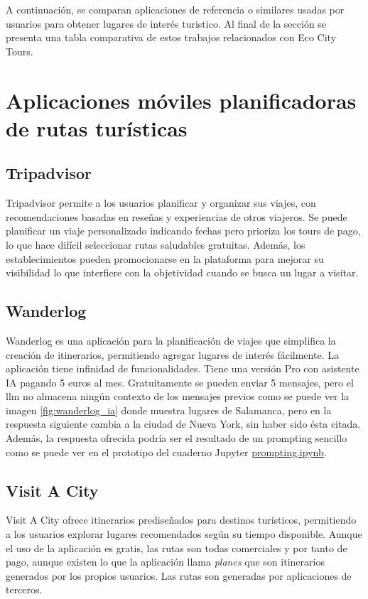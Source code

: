 
A continuación, se comparan aplicaciones de referencia o similares usadas por usuarios para obtener lugares de interés turistico. Al final de la sección se presenta una tabla comparativa de estos trabajos relacionados con Eco City Tours.
\section{Aplicaciones móviles planificadoras de rutas turísticas}
\subsection{Tripadvisor}
Tripadvisor\cite{tripadvisor} permite a los usuarios planificar y organizar sus viajes, con recomendaciones basadas en reseñas y experiencias de otros viajeros. Se puede planificar un viaje personalizado indicando fechas pero prioriza los tours de pago, lo que hace difícil seleccionar rutas saludables gratuitas. Además, los establecimientos pueden promocionarse en la plataforma para mejorar su visibilidad lo que interfiere con la objetividad cuando se busca un lugar a visitar.

\subsection{Wanderlog}
Wanderlog\cite{wanderlog} es una aplicación para la planificación de viajes que simplifica la creación de itinerarios, permitiendo agregar lugares de interés fácilmente. La aplicación tiene infinidad de funcionalidades. Tiene una versión Pro con asistente IA pagando 5 euros al mes. Gratuitamente se pueden enviar 5 mensajes, pero el \acrshort{llm} no almacena ningún contexto de los mensajes previos como se puede ver la imagen \ref{fig:wanderlog_ia} donde muestra lugares de  Salamanca, pero en la respuesta siguiente cambia a la ciudad de Nueva York, sin haber sido ésta citada. Además, la respuesta ofrecida podría ser el resultado de un prompting sencillo como se puede ver en el prototipo del cuaderno Jupyter \href{https://github.com/fps1001/TFGII_FPisot/tree/main/project-prototypes/prompting.ipynb}{prompting.ipynb}.

\subsection{Visit A City}
Visit A City\cite{visitacity} ofrece itinerarios prediseñados para destinos turísticos, permitiendo a los usuarios explorar lugares recomendados según su tiempo disponible. Aunque el uso de la aplicación es gratis, las rutas son todas comerciales y por tanto de pago, aunque existen lo que la aplicación llama \textit{planes} que son itinerarios generados por los propios usuarios. Las rutas son generadas por aplicaciones de terceros.


